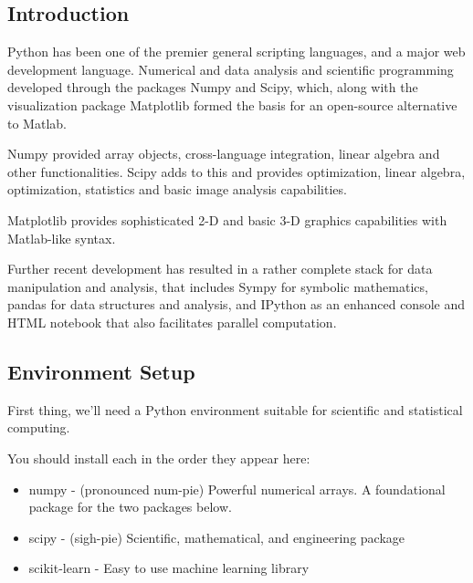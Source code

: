 \documentclass[11pt]{article} %
\begin{document}
\subsection*{Introduction}

Python has been one of the premier general scripting languages, and a major web development language. 
Numerical and data analysis and scientific programming developed through the packages Numpy and Scipy, 
which, along with the visualization package Matplotlib formed the basis for an open-source alternative to Matlab. 

Numpy provided array objects, cross-language integration, linear algebra and other functionalities. 
Scipy adds to this and provides optimization, linear algebra, optimization, statistics and basic image analysis 
capabilities. 

Matplotlib provides sophisticated 2-D and basic 3-D graphics capabilities with Matlab-like syntax.


Further recent development has resulted in a rather complete stack for data manipulation and analysis, that includes Sympy for symbolic mathematics, pandas for data structures and analysis, and IPython as an enhanced console and HTML notebook that also facilitates parallel computation.



\newpage
\subsection*{Environment Setup}

First thing, we'll need a Python environment suitable for scientific and statistical computing. 

You should install each in the order they appear here:

\begin{itemize}
\item numpy - (pronounced num-pie) Powerful numerical arrays. A foundational package for the two packages below.
\item scipy - (sigh-pie) Scientific, mathematical, and engineering package
\item scikit-learn - Easy to use machine learning library
\end{itemize}

\end{document}
